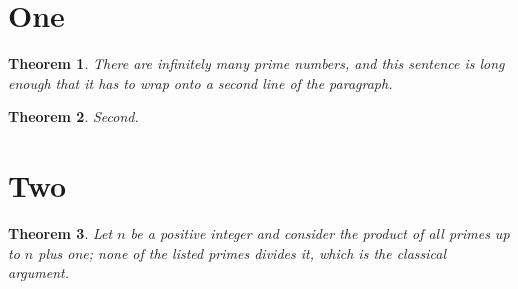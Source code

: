 \documentclass{article}
\newtheorem{theorem}{Theorem}
\numberwithin{theorem}{section}
\begin{document}
\section{One}
\begin{theorem}
There are infinitely many prime numbers, and this sentence is long enough that it has to wrap onto a second line of the paragraph.
\end{theorem}
\begin{theorem}
Second.
\end{theorem}
\section{Two}
\begin{theorem}
Let $n$ be a positive integer and consider the product of all primes up to $n$ plus one; none of the listed primes divides it, which is the classical argument.
\end{theorem}
\end{document}
